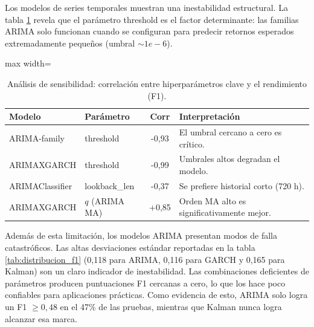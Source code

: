Los modelos de series temporales muestran una inestabilidad estructural. La tabla \ref{tab:sensibilidad_estadistica} revela que el parámetro threshold es el factor determinante: las familias ARIMA solo funcionan cuando se configuran para predecir retornos esperados extremadamente pequeños (umbral $\sim 1e-6$).

\begin{table}[H]
  \centering
  \caption[Sensibilidad de Parámetros]{Análisis de sensibilidad: correlación entre hiperparámetros clave y el rendimiento (F1).}
  \small
  \begin{adjustbox}{max width=\textwidth}
    \begin{tabular}{l l c p{5.5cm}}
      \toprule
      \textbf{Modelo} & \textbf{Parámetro} & \textbf{Corr} & \textbf{Interpretación} \\
      \midrule
      ARIMA-family        & threshold       & -0,93 & El umbral cercano a cero es crítico. \\
      ARIMAXGARCH         & threshold       & -0,99 & Umbrales altos degradan el modelo. \\
      ARIMAClassifier     & lookback\_len   & -0,37 & Se prefiere historial corto (720 h). \\
      ARIMAXGARCH         & $q$ (ARIMA MA)  & +0,85 & Orden MA alto es significativamente mejor. \\
      \bottomrule
    \end{tabular}
  \end{adjustbox}
  \label{tab:sensibilidad_estadistica}
\end{table}

Además de esta limitación, los modelos ARIMA presentan modos de falla catastróficos. Las altas desviaciones estándar reportadas en la tabla \ref{tab:distribucion_f1} (0,118 para ARIMA, 0,116 para GARCH y 0,165 para Kalman) son un claro indicador de inestabilidad. Las combinaciones deficientes de parámetros producen puntuaciones F1 cercanas a cero, lo que los hace poco confiables para aplicaciones prácticas. Como evidencia de esto, ARIMA solo logra un F1 $\geq 0,48$ en el 47\% de las pruebas, mientras que Kalman nunca logra alcanzar esa marca.

